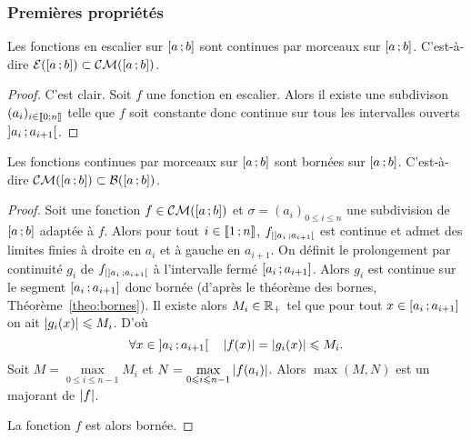 \subsubsection{Premières propriétés}

\begin{prop}
  Les fonctions en escalier sur \(\left[ a \, ; {} b \right]\) sont continues par 
  morceaux sur \(\left[ a \, ; {} b \right]\). C'est-à-dire \(\mathcal{E}(\left[ a \, ; {} b \right]) 
  \subset \mathcal{CM}(\left[ a \, ; {} b \right])\).
\end{prop}
\begin{proof}
  C'est clair. Soit \(f\) une fonction en escalier. Alors il existe une 
  subdivison \((a_i)_{i \in \mathopen{\llbracket}0\mathclose{}\mathpunct{};n\mathclose{\rrbracket}}\) telle que \(f\) soit 
  constante donc continue sur tous les intervalles ouverts 
  \(\left] a_i \, ; {} a_{i+1} \right[\).
\end{proof}

\begin{prop}
  Les fonctions continues par morceaux sur \(\left[ a \, ; {} b \right]\) sont bornées 
  sur \(\left[ a \, ; {} b \right]\). C'est-à-dire \(\mathcal{CM}(\left[ a \, ; {} b \right]) \subset 
  \mathcal{B}(\left[ a \, ; {} b \right])\).
\end{prop}
\begin{proof}
  Soit une fonction \(f \in \mathcal{CM}(\left[ a \, ; {} b \right])\) et \(\sigma=(a_i)_{0 
  \leqslant i \leqslant n}\) une subdivision de \(\left[ a \, ; {} b \right]\) adaptée 
  à \(f\). Alors pour tout \(i \in \mathopen{\llbracket}1\mathclose{}\mathpunct{};n\mathclose{\rrbracket}\), 
  \(f_{|\left] a_i \, ; {} a_{i+1} \right[}\) est continue et admet des limites finies 
  à droite en \(a_{i}\) et à gauche en \(a_{i+1}\). On définit le prolongement 
  par continuité \(g_i\) de \(f_{|\left] a_i \, ; {} a_{i+1} \right[}\) à l'intervalle 
  fermé \(\left[ a_i \, ; {} a_{i+1} \right]\). Alors \(g_i\) est continue sur le 
  segment \(\left[ a_i \, ; {} a_{i+1} \right]\) donc bornée (d'après le théorème des 
  bornes, Théorème~\ref{theo:bornes}). Il existe alors \(M_i \in \mathbb{R}_+\) tel que pour tout \(x \in 
  \left[ a_i \, ; {} a_{i+1} \right] \) on ait \(\left\lvert g_i(x)\right\rvert \leqslant M_i\). D'où
  \begin{equation}
    \forall x \in \left] a_i \, ; {} a_{i+1} \right[ \quad \left\lvert f(x)\right\rvert=\left\lvert g_i(x)\right\rvert 
    \leqslant M_i.
  \end{equation}
  Soit \(M=\max\limits_{0 \leqslant i \leqslant n-1} M_i\) et \(N=\max\limits_{0 
  \leqslant i \leqslant n-1} \left\lvert f(a_i)\right\rvert\). Alors \(\max(M,N)\) est un majorant 
  de \(\left\lvert f\right\rvert\).

  La fonction \(f\) est alors bornée.
\end{proof}

